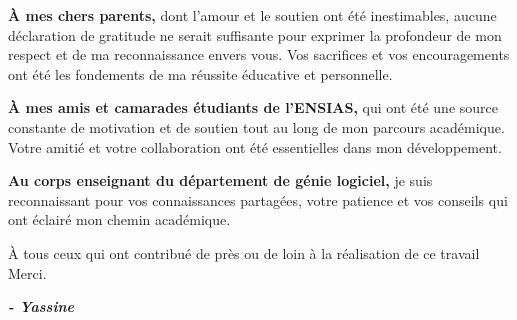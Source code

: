 \begin{fquote}
\begin{center}
\thispagestyle{empty}
\large{

\textbf{À mes chers parents,} dont l'amour et le soutien ont été inestimables, aucune déclaration de gratitude ne serait suffisante pour exprimer la profondeur de mon respect et de ma reconnaissance envers vous. Vos sacrifices et vos encouragements ont été les fondements de ma réussite éducative et personnelle.

\textbf{À mes amis et camarades étudiants de l'ENSIAS,} qui ont été une source constante de motivation et de soutien tout au long de mon parcours académique. Votre amitié et votre collaboration ont été essentielles dans mon développement.

\textbf{Au corps enseignant du département de génie logiciel,} je suis reconnaissant pour vos connaissances partagées, votre patience et vos conseils qui ont éclairé mon chemin académique.

À tous ceux qui ont contribué de près ou de loin à la réalisation de ce travail
\\[12pt]
Merci.
}
\end{center}
\bigskip
\medskip
\end{fquote}

\hspace*{\fill} \textbf{\textit{\large{- Yassine}}}

\clearpage